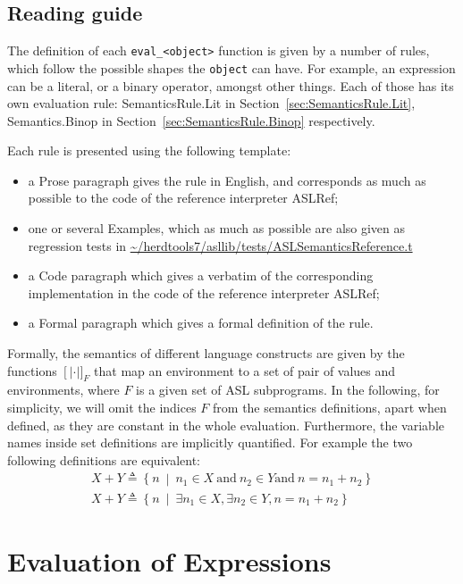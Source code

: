 \documentclass{book}
\newcommand\llbracket{[|}
\newcommand\rrbracket{|]}
\newcommand\interp[1]{\left\llbracket #1 \right\rrbracket}
\newcommand\st[0]{\ \middle|\ }
\begin{document}
\section{Reading guide}

The definition of each \texttt{eval\_<object>} function is given by a number of
rules, which follow the possible shapes the \texttt{object} can have. For
example, an expression can be a literal, or a binary operator, amongst other
things. Each of those has its own evaluation rule: SemanticsRule.Lit in
Section~\ref{sec:SemanticsRule.Lit}, Semantics.Binop in
Section~\ref{sec:SemanticsRule.Binop} respectively.

Each rule is presented using the following template:
\begin{itemize}
\item a Prose paragraph gives the rule in English, and corresponds as much as possible to the code of the reference interpreter ASLRef;
\item one or several Examples, which as much as possible are also given as regression tests in \url{~/herdtools7/asllib/tests/ASLSemanticsReference.t} 
\item a Code paragraph which gives a verbatim of the corresponding implementation in the code of the reference interpreter ASLRef;
\item a Formal paragraph which gives a formal definition of the rule.
\end{itemize}
%
Formally, the semantics of different language constructs are given by the functions
$\interp{\cdot}_F$ that map an environment to a set of pair of values and
environments, where $F$ is a given set of ASL subprograms.
%
In the following, for simplicity, we will omit the indices $F$ from the
semantics definitions, apart when defined, as they are constant in the whole
evaluation.
%
Furthermore, the variable names inside set definitions are implicitly
quantified. For example the two following definitions are equivalent:
%
\begin{gather*}
  X + Y \triangleq \left\{ n \st{} n_1 \in X \ \text{and}\ n_2 \in Y \text{and}\ n = n_1 + n_2 \right\}
  \\
  X + Y \triangleq \left\{ n \st{} \exists n_1 \in X, \exists n_2 \in Y, n = n_1 + n_2 \right\}
\end{gather*}


\chapter{Evaluation of Expressions \label{chap:eval_expr}}
\end{document}
